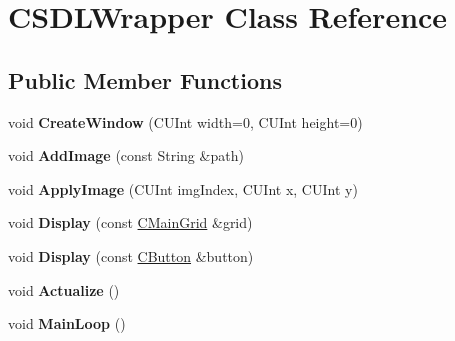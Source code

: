 \hypertarget{classCSDLWrapper}{\section{C\-S\-D\-L\-Wrapper Class Reference}
\label{classCSDLWrapper}
}
\subsection*{Public Member Functions}
\begin{DoxyCompactItemize}
\item 
\hypertarget{classCSDLWrapper_aad273110638082785f343eb090dc5d3c}{void {\bfseries Create\-Window} (C\-U\-Int width=0, C\-U\-Int height=0)}\label{classCSDLWrapper_aad273110638082785f343eb090dc5d3c}

\item 
\hypertarget{classCSDLWrapper_a9579a55f0a9a7ea676935bdbd8cf46ea}{void {\bfseries Add\-Image} (const String \&path)}\label{classCSDLWrapper_a9579a55f0a9a7ea676935bdbd8cf46ea}

\item 
\hypertarget{classCSDLWrapper_ae58baf0891ce060ce9505ab25a46b7b7}{void {\bfseries Apply\-Image} (C\-U\-Int img\-Index, C\-U\-Int x, C\-U\-Int y)}\label{classCSDLWrapper_ae58baf0891ce060ce9505ab25a46b7b7}

\item 
\hypertarget{classCSDLWrapper_aa227a005cc9ff099b3cb3b698d7bb925}{void {\bfseries Display} (const \hyperlink{classCMainGrid}{C\-Main\-Grid} \&grid)}\label{classCSDLWrapper_aa227a005cc9ff099b3cb3b698d7bb925}

\item 
\hypertarget{classCSDLWrapper_aff7ea8946d30fe7e8c00966155f536a6}{void {\bfseries Display} (const \hyperlink{classCButton}{C\-Button} \&button)}\label{classCSDLWrapper_aff7ea8946d30fe7e8c00966155f536a6}

\item 
\hypertarget{classCSDLWrapper_a22206e6af4087a884970ba1800feb224}{void {\bfseries Actualize} ()}\label{classCSDLWrapper_a22206e6af4087a884970ba1800feb224}

\item 
\hypertarget{classCSDLWrapper_a44e500f2b108ad52dd5e0585ac3483c2}{void {\bfseries Main\-Loop} ()}\label{classCSDLWrapper_a44e500f2b108ad52dd5e0585ac3483c2}

\end{DoxyCompactItemize}
